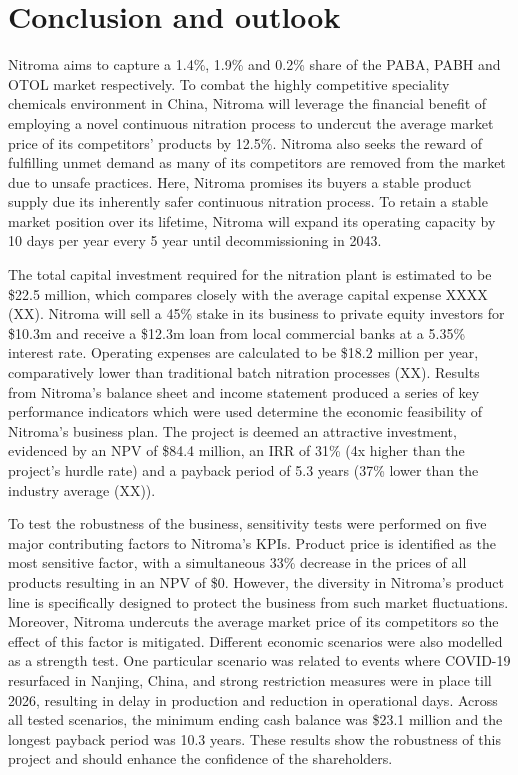 \section{Conclusion and outlook}
Nitroma aims to capture a 1.4\%, 1.9\% and 0.2\% share of the PABA, PABH and OTOL market respectively. To combat the highly competitive speciality chemicals environment in China, Nitroma will leverage the financial benefit of employing a novel continuous nitration process to undercut the average market price of its competitors’ products by 12.5\%. Nitroma also seeks the reward of fulfilling unmet demand as many of its competitors are removed from the market due to unsafe practices. Here, Nitroma promises its buyers a stable product supply due its inherently safer continuous nitration process. To retain a stable market position over its lifetime, Nitroma will expand its operating capacity by 10 days per year every 5 year until decommissioning in 2043.

The total capital investment required for the nitration plant is estimated to be \$22.5 million, which compares closely with the average capital expense XXXX (XX). Nitroma will sell a 45\% stake in its business to private equity investors for \$10.3m and receive a \$12.3m loan from local commercial banks at a 5.35\% interest rate. Operating expenses are calculated to be \$18.2 million per year, comparatively lower than traditional batch nitration processes (XX).  Results from Nitroma’s balance sheet and income statement produced a series of key performance indicators which were used determine the economic feasibility of Nitroma’s business plan. The project is deemed an attractive investment, evidenced by an NPV of \$84.4 million, an IRR of 31\% (4x higher than the project’s hurdle rate) and a payback period of 5.3 years (37\% lower than the industry average (XX)).

To test the robustness of the business, sensitivity tests were performed on five major contributing factors to Nitroma’s KPIs. Product price is identified as the most sensitive factor, with a simultaneous 33\% decrease in the prices of all products resulting in an NPV of \$0. However, the diversity in Nitroma’s product line is specifically designed to protect the business from such market fluctuations. Moreover, Nitroma undercuts the average market price of its competitors so the effect of this factor is mitigated. Different economic scenarios were also modelled as a strength test. One particular scenario was related to events where COVID-19 resurfaced in Nanjing, China, and strong restriction measures were in place till 2026, resulting in delay in production and reduction in operational days. Across all tested scenarios, the minimum ending cash balance was \$23.1 million and the longest payback period was 10.3 years. These results show the robustness of this project and should enhance the confidence of the shareholders.